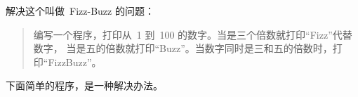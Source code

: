 \begin{Exercise}[title={FizzBuzz},difficulty=1]
\label{ex:fizzbuzz}
\Question \label{ex:fizzbuzz q1} 解决这个叫做~Fizz-Buzz\cite{fizzbuzz} 的问题：
\begin{quote}
编写一个程序，打印从~1 到~100 的数字。当是三个倍数就打印``Fizz''代替数字，
当是五的倍数就打印``Buzz''。当数字同时是三和五的倍数时，打印``FizzBuzz''。
\end{quote}
\end{Exercise}

\begin{Answer}
\Question 下面简单的程序，是一种解决办法。

\showremarks
\end{Answer}

